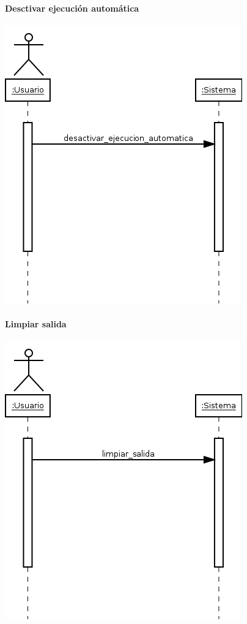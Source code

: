 \paragraph{Desctivar ejecución automática}
\begin{center}
\includegraphics[scale=0.4]{desactivar_ejecucion_automatica.png} \\
\end{center}
\paragraph{Limpiar salida}
\begin{center}
\includegraphics[scale=0.4]{limpiar_salida.png} \\
\end{center}
